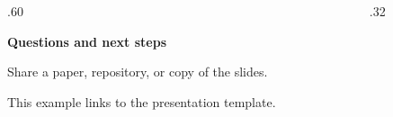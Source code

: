 \begin{frame}{}
  \begin{columns}[c,onlytextwidth]
    \begin{column}{.60\textwidth}
      {\large\bfseries\color{wvu-blue}Questions and next steps\par}
      \medskip
      Share a paper, repository, or copy of the slides.

      \bigskip
      This example links to the presentation template.
    \end{column}
    \begin{column}{.32\textwidth}
      \centering
    \end{column}
  \end{columns}
\end{frame}
